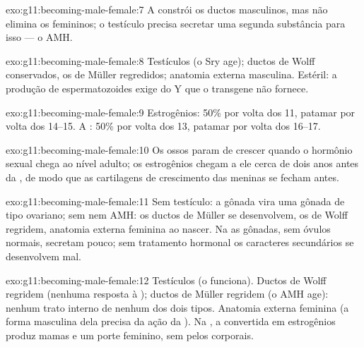 \begin{solution}{exo:g11:becoming-male-female:7}
A  constrói os ductos masculinos, mas não elimina os
femininos; o testículo precisa secretar uma segunda substância para
isso --- o AMH.
\end{solution}

\begin{solution}{exo:g11:becoming-male-female:8}
Testículos (o Sry age); ductos de Wolff conservados, os de Müller
regredidos; anatomia externa masculina. Estéril: a produção de
espermatozoides exige  do Y que o transgene não fornece.
\end{solution}

\begin{solution}{exo:g11:becoming-male-female:9}
Estrogênios: 50\% por volta dos 11, patamar por volta dos 14--15. A
: 50\% por volta dos 13, patamar por volta dos 16--17.
\end{solution}

\begin{solution}{exo:g11:becoming-male-female:10}
Os ossos param de crescer quando o hormônio sexual chega ao nível
adulto; os estrogênios chegam a ele cerca de dois anos antes da
, de modo que as cartilagens de crescimento das meninas se
fecham antes.
\end{solution}

\begin{solution}{exo:g11:becoming-male-female:11}
Sem testículo: a gônada vira uma gônada de tipo ovariano; sem
 nem AMH: os ductos de Müller se desenvolvem, os de Wolff
regridem, anatomia externa feminina ao nascer. Na  as gônadas,
sem óvulos normais, secretam pouco; sem tratamento hormonal os
caracteres secundários se desenvolvem mal.
\end{solution}

\begin{solution}{exo:g11:becoming-male-female:12}
Testículos (o  funciona). Ductos de Wolff regridem (nenhuma resposta
à ); ductos de Müller regridem (o AMH age): nenhum trato
interno de nenhum dos dois tipos. Anatomia externa feminina (a forma
masculina dela precisa da ação da ). Na , a
 convertida em estrogênios produz mamas e um porte
feminino, sem pelos corporais.
\end{solution}

